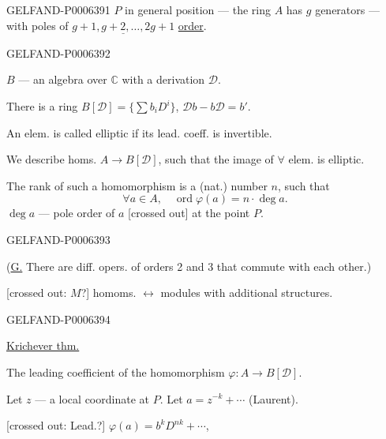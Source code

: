 \begin{GelfandAdjacentEvidence}{GELFAND-P000639}{1}
\(P\) in general position --- the ring \(A\) has \(g\) generators ---
with poles of \(\underline{g+1,g+2,\ldots,2g+1}\) \underline{order}.
\end{GelfandAdjacentEvidence}
\begin{GelfandAdjacentEvidence}{GELFAND-P000639}{2}


\(B\) --- an algebra over \(\mathbb C\) with a derivation \(\mathcal D\).

There is a ring \(B[\mathcal D]=\{\sum b_iD^i\}\),
\(\mathcal Db-b\mathcal D=b'\).

An elem. is called elliptic if its lead. coeff. is invertible.

We describe homs. \(A\to B[\mathcal D]\), such that the image of \(\forall\) elem. is elliptic.

The rank of such a homomorphism is a (nat.) number \(n\), such that
\[
\forall a\in A,\quad \operatorname{ord}\varphi(a)=n\cdot\operatorname{deg}a.
\]
\(\operatorname{deg}a\) --- pole order of \(a\) [crossed out] at the point \(P\).
\end{GelfandAdjacentEvidence}
\begin{GelfandAdjacentEvidence}{GELFAND-P000639}{3}


(\underline{G.} There are diff. opers. of orders 2 and 3 that commute with each other.)

[crossed out: \(M\)?] homoms. \(\longleftrightarrow\) modules with additional structures.
\end{GelfandAdjacentEvidence}
\begin{GelfandAdjacentEvidence}{GELFAND-P000639}{4}


\underline{Krichever thm.}

The leading coefficient of the homomorphism \(\varphi:A\to B[\mathcal D]\).

Let \(z\) --- a local coordinate at \(P\).
Let \(a=z^{-k}+\cdots\) (Laurent).

[crossed out: Lead.?] \(\varphi(a)=b^k D^{nk}+\cdots\),
\end{GelfandAdjacentEvidence}
